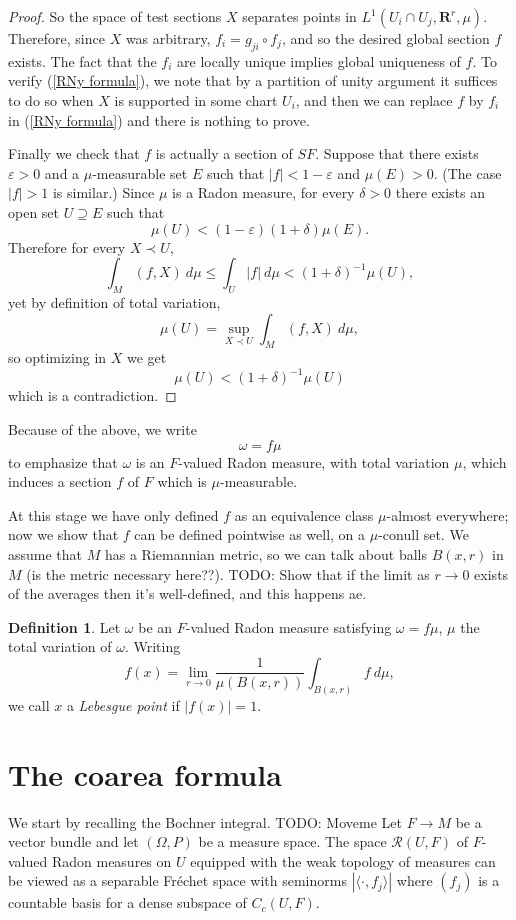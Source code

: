 \documentclass[reqno,12pt,letterpaper]{amsart}
\newcommand{\RR}{\mathbf{R}}
\newcommand{\dfn}[1]{\emph{#1}\index{#1}}
\theoremstyle{definition}
\newtheorem{definition}[theorem]{Definition}
\numberwithin{equation}{section}
\begin{document}
\begin{proof}
So the space of test sections $X$ separates points in $L^1(U_i \cap U_j, \RR^r, \mu)$.
Therefore, since $X$ was arbitrary, $f_i = g_{ji} \circ f_j$, and so the desired global section $f$ exists.
The fact that the $f_i$ are locally unique implies global uniqueness of $f$.
To verify (\ref{RNy formula}), we note that by a partition of unity argument it suffices to do so when $X$ is supported in some chart $U_i$, and then we can replace $f$ by $f_i$ in (\ref{RNy formula}) and there is nothing to prove.

Finally we check that $f$ is actually a section of $SF$.
Suppose that there exists $\varepsilon > 0$ and a $\mu$-measurable set $E$ such that $|f| < 1 - \varepsilon$ and $\mu(E) > 0$. (The case $|f| > 1$ is similar.)
Since $\mu$ is a Radon measure, for every $\delta > 0$ there exists an open set $U \supseteq E$ such that
$$\mu(U) < (1 - \varepsilon)(1 + \delta)\mu(E).$$
Therefore for every $X \prec U$,
$$\int_M (f, X) ~d\mu \leq \int_U |f| ~d\mu < (1 + \delta)^{-1}\mu(U),$$
yet by definition of total variation,
$$\mu(U) = \sup_{X \prec U} \int_M (f, X) ~d\mu,$$
so optimizing in $X$ we get
$$\mu(U) < (1 + \delta)^{-1}\mu(U)$$
which is a contradiction.
\end{proof}

Because of the above, we write
$$\omega = f\mu$$
to emphasize that $\omega$ is an $F$-valued Radon measure, with total variation $\mu$, which induces a section $f$ of $F$ which is $\mu$-measurable.

At this stage we have only defined $f$ as an equivalence class $\mu$-almost everywhere; now we show that $f$ can be defined pointwise as well, on a $\mu$-conull set.
We assume that $M$ has a Riemannian metric, so we can talk about balls $B(x, r)$ in $M$ (is the metric necessary here??).
TODO: Show that if the limit as $r \to 0$ exists of the averages then it's well-defined, and this happens ae.

\begin{definition}
Let $\omega$ be an $F$-valued Radon measure satisfying $\omega = f\mu$, $\mu$ the total variation of $\omega$.
Writing
$$f(x) = \lim_{r \to 0}\frac{1}{\mu(B(x, r))} \int_{B(x, r)} f ~d\mu,$$
we call $x$ a \dfn{Lebesgue point} if $|f(x)| = 1$.
\end{definition}

\section{The coarea formula} \label{coarea section}
We start by recalling the Bochner integral.
TODO: Moveme
Let $F \to M$ be a vector bundle and let $(\Omega, P)$ be a measure space.
The space $\mathcal R(U, F)$ of $F$-valued Radon measures on $U$ equipped with the weak topology of measures can be viewed as a separable Fr\'echet space with seminorms $|\langle \cdot, f_j\rangle|$ where $(f_j)$ is a countable basis for a dense subspace of $C_c(U, F)$.
\end{document}
